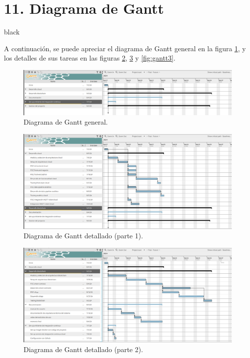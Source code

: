 \documentclass[
11pt, %
]{charter}
\begin{document}
\section{11. Diagrama de Gantt}
\label{sec:gantt}


\begin{consigna}{black}

A continuación, se puede apreciar el diagrama de Gantt general en la figura \ref{fig:gantt0}, y los detalles de sus tareas en las figuras \ref{fig:gantt1}, \ref{fig:gantt2} y \ref{fig:gantt3}.

\begin{figure}[htpb]
\centering
\includegraphics[width=1\textwidth]{./Figuras/gantt-0}
\caption{Diagrama de Gantt general.}
\label{fig:gantt0}
\end{figure}

\begin{figure}[htpb]
\centering
\includegraphics[width=1\textwidth]{./Figuras/gantt-1}
\caption{Diagrama de Gantt detallado (parte 1).}
\label{fig:gantt1}
\end{figure}

\begin{figure}[htpb]
\centering
\includegraphics[width=1\textwidth]{./Figuras/gantt-2}
\caption{Diagrama de Gantt detallado (parte 2).}
\label{fig:gantt2}
\end{figure}


\end{consigna}
\end{document}
